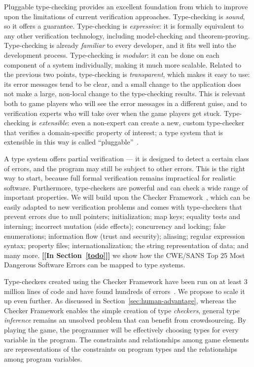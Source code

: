 \documentclass[preprint]{sig-alternate}
\newcommand{\secref}[1]{Section~\ref{#1}}
\newcommand{\todo}[1]{{\color{red}\bfseries [[#1]]}}
\begin{document}
Pluggable type-checking provides an excellent foundation from which to
improve upon the limitations of current verification
approaches. Type-checking is \emph{sound}, so it offers a guarantee.
Type-checking is \emph{expressive}: it is formally equivalent
\cite{CurryHoward2006,MartinLoef1984,CoquandHuet1988,Cousot1997,CousotCousot2000,NaikPalsberg2005}
to any other verification technology, including model-checking and
theorem-proving.  Type-checking is already \emph{familiar} to every
developer, and it fits well into the development process.
Type-checking is \emph{modular}: it can be done on each component of a
system individually, making it much more scalable.  Related to the
previous two points, type-checking is \emph{transparent}, which makes
it easy to use: its error messages tend to be clear, and a small
change to the application does not make a large, non-local change to
the type-checking results.  This is relevant both to game players who
will see the error messages in a different guise, and to verification
experts who will take over when the game players get stuck.
Type-checking is \emph{extensible}: even a non-expert can create a
new, custom type-checker that verifies a domain-specific property of
interest; a type system that is extensible in this way is called
``pluggable''~\cite{Bracha2004}.

A type system offers partial verification --- it is designed to detect
a certain class of errors, and the program may still be subject to
other errors.  This is the right way to start, because full formal
verification remains impractical for realistic software.  Furthermore,
type-checkers are powerful and can check a wide range of important
properties.  We will build upon the Checker
Framework~\cite{PapiACPE2008,DietlDEMS2011,checker-framework-website-20100203},
which can be easily adapted to new verification problems and comes
with type-checkers that prevent errors due to null pointers;
initialization; map keys; equality tests and interning; incorrect
mutation (side effects); concurrency and locking; fake enumerations;
information flow (trust and security); aliasing; regular expression
syntax; property files; internationalization; the string
representation of data; and many more.  \todo{In \secref{todo}} we
show how the CWE/SANS Top 25 Most Dangerous Software Errors can be
mapped to type systems.

Type-checkers created using the Checker Framework have been run on at
least 3 million lines of code and have found hundreds of
errors~\cite{PapiACPE2008,DietlDEMS2011}.  We propose to scale it up
even further.  As discussed in \secref{sec:human-advantage},
whereas the Checker Framework enables the simple creation of type
\emph{checkers}, general type \emph{inference} remains an unsolved
problem that can benefit from crowdsourcing.
By playing the game, the programmer will be effectively choosing types for
every variable in the program.  The constraints and relationships among
game elements are representations of the constraints on program types and
the relationships among program variables.
\end{document}
